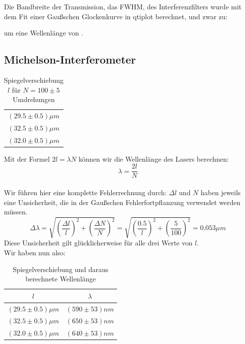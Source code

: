 \documentclass{article}
\begin{document}
Die Bandbreite der Transmission, das FWHM, des Interferenzfilters wurde mit dem Fit einer Gaußschen Glockenkurve in qtiplot berechnet, und zwar zu:
\begin{center}
\end{center}
um eine Wellenlänge von .
\subsection{Michelson-Interferometer}
\begin{table}[H]
\begin{center}
\begin{tabular}{c}
$(29.5\pm 0.5)\mu m$\\
$(32.5\pm 0.5)\mu m$\\
$(32.0\pm 0.5)\mu m$\\
\end{tabular}
\caption{Spiegelverschiebung $l$ für $N=100 \pm 5$ Umdrehungen}
\end{center}
\end{table}
\vspace{0.3mm}

Mit der Formel $2 l=\lambda N$ können wir die Wellenlänge des Lasers berechnen:
$$\lambda=\frac{2l}{N}$$
\\
Wir führen hier eine komplette Fehlerrechnung durch:
$\Delta l$ und $N$ haben jeweils eine Unsicherheit, die in der Gaußschen Fehlerfortpflanzung verwendet werden müssen.\\
$$\Delta \lambda=\sqrt{\left(\frac{\Delta l}{l}\right)^2+\left(\frac{\Delta N}{N}\right)^2}=\sqrt{\left(\frac{0.5}{l}\right)^2+\left(\frac{5}{100}\right)^2}=0.053 \mu m$$
Diese Unsicherheit gilt glücklicherweise für alle drei Werte von $l$.\\
Wir haben nun also: 
\begin{table}[H]
\begin{center}
\begin{tabular}{|c|c|}
\hline
$l$ & $\lambda$\\
\hline
$(29.5\pm 0.5)\mu m$ & $(590 \pm 53)nm$\\
$(32.5\pm 0.5)\mu m$ & $(650 \pm 53)nm$\\
$(32.0\pm 0.5)\mu m$ & $(640 \pm 53)nm$\\
\hline
\end{tabular}
\caption{Spiegelverschiebung und daraus berechnete Wellenlänge}
\end{center}
\end{table}
\vspace{0.3mm}
\end{document}
